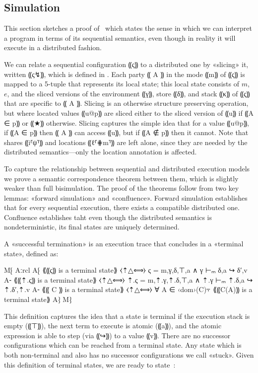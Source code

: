 \subsection{Simulation}
\label{subsec:mpc-design-sim}

This section sketches a proof of~ which states
the sense in which we can interpret a \mpc program in terms of its
sequential semantics, even though in reality it will execute in a
distributed fashion.


We can relate a sequential configuration ⸨ς⸩ to a distributed one by
«slicing» it, written ⸨ς↯⸩, which is defined in . Each
party ⸨ A ⸩ in the mode ⸨m⸩ of ⸨ς⸩ is mapped to a 5-tuple that represents its
local state; this local state consists of $m$, $e$, and the sliced
versions of the environment
⸨γ⸩, store ⸨δ⸩, and stack ⸨κ⸩ of ⸨ς⸩ that are specific to ⸨ A ⸩. Slicing is an
otherwise structure preserving operation, but where located values ⸨u@p⸩ are
sliced either to the sliced version of ⸨u⸩ if ⸨A ∈ p⸩ or ⸨★⸩ otherwise. Slicing
captures the simple idea that for a value ⸨u@p⸩, if ⸨A ∈ p⸩ then ⸨ A ⸩ can
access ⸨u⸩, but if ⸨A ∉ p⸩ then it cannot. Note that
shares ⸨i⸢ψ⸣⸩ and locations ⸨ℓ⸢⋕m⸣⸩ are left alone, since they are
needed by the distributed semantics---only the
location annotation is affected.

To capture the relationship between sequential and distributed execution
models we prove a semantic correspondence theorem between them, which is
slightly weaker than full bisimulation. The proof of the theorems follow
from two key lemmas: «forward simulation» and «confluence». Forward simulation
establishes that for every sequential execution, there exists a compatible distributed
one. Confluence establishes taht even though the distributed semantics is nondeterministic,
its final states are uniquely determined.

A «successful termination» is an execution trace that
concludes in a «terminal state», defined as:

M⁅ Aːrcl
   A⁅ ⟪⸨ς⸩ is a terminal state⟫   ⧼⇡△⟺⧽ ς = m,γ,δ,⊤,a ∧ γ ⊢ₘ δ,a ↪ δ′,v
   A⁃ ⟪⸨⇡.ς⸩ is a terminal state⟫ ⧼⇡△⟺⧽ ⇡.ς = m,⇡.γ,⇡.δ,⊤,a ∧ ⇡.γ ⊢ₘ ⇡.δ,a ↪ ⇡.δ′,⇡.v
   A⁃ ⟪⸨ C ⸩ is a terminal state⟫   ⧼⇡△⟺⧽ ∀ A ∈ ‹dom›(C)⍪ ⟪⸨C(A)⸩ is a terminal state⟫
   A⁆
   M⁆

This definition captures the idea that a state is terminal if the execution
stack is empty (⸨⊤⸩), the next term to execute is atomic (⸨a⸩), and the
atomic expression is able to step (via ⸨↪⸩) to a value ⸨v⸩.
There are no successor configurations which can be reached from a terminal state. Any
state which is both non-terminal and also has no successor configurations we
call «stuck». Given this definition of terminal states, we are ready to
state~:

